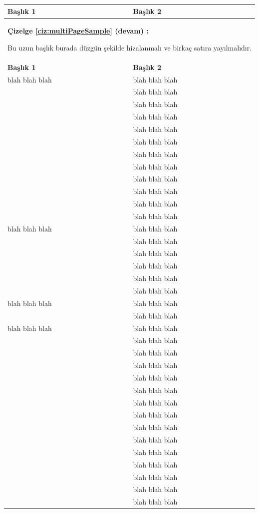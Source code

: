 \documentclass[a4paper,oneside,12pt]{report}
\begin{document}
\begin{center}
	\addtocounter{table}{-1}
	\begin{longtable}{ll}\hline
		\textbf{Başlık 1}& \textbf{Başlık 2}\\\hline
		\endfirsthead
		\multicolumn{2}{m{1\textwidth}}{%
			\textbf{Çizelge \ref{ciz:multiPageSample} (devam) :} \hspace{0.5em} 
			\parbox[t]{0.65\textwidth}{%
				Bu uzun başlık burada düzgün şekilde hizalanmalı ve birkaç satıra yayılmalıdır.
			}
		} \\ \hline
		\textbf{Başlık 1}& \textbf{Başlık 2}\\ \hline
		\endhead
		\endfoot
		\endlastfoot
		blah blah blah & blah blah blah \\
		& blah blah blah \\
		& blah blah blah \\
		& blah blah blah \\
		& blah blah blah \\
		& blah blah blah \\
		& blah blah blah \\
		& blah blah blah \\
		& blah blah blah \\
		& blah blah blah \\
		& blah blah blah \\
		& blah blah blah \\
		
		blah blah blah & blah blah blah \\
		& blah blah blah \\
		& blah blah blah \\
		& blah blah blah \\
		& blah blah blah \\
		& blah blah blah \\
		
		blah blah blah & blah blah blah \\ \hline
		& blah blah blah \\
		blah blah blah & blah blah blah \\
		& blah blah blah \\
		& blah blah blah \\
		& blah blah blah \\
		& blah blah blah \\
		& blah blah blah \\
		& blah blah blah \\
		& blah blah blah \\
		& blah blah blah \\
		& blah blah blah \\
		& blah blah blah \\
		& blah blah blah \\
		& blah blah blah \\
		& blah blah blah \\
		& blah blah blah \\
		

\end{longtable}
\end{center}
\end{document}
